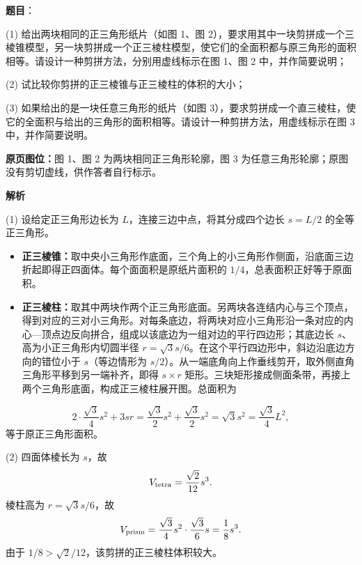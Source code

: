 \begin{answer}

\textbf{题目}：

(1) 给出两块相同的正三角形纸片（如图 1、图 2），要求用其中一块剪拼成一个三棱锥模型，另一块剪拼成一个正三棱柱模型，使它们的全面积都与原三角形的面积相等。请设计一种剪拼方法，分别用虚线标示在图 1、图 2 中，并作简要说明；

(2) 试比较你剪拼的正三棱锥与正三棱柱的体积的大小；

(3) 如果给出的是一块任意三角形的纸片（如图 3），要求剪拼成一个直三棱柱，使它的全面积与给出的三角形的面积相等。请设计一种剪拼方法，用虚线标示在图 3 中，并作简要说明。

\textbf{原页图位：}图 1、图 2 为两块相同正三角形轮廓，图 3 为任意三角形轮廓；原图没有剪切虚线，供作答者自行标示。
\nopagebreak[4]
\begin{center}\end{center}
\nopagebreak[4]
\textbf{解析}
\nopagebreak[4]
\begin{center}\end{center}
\nopagebreak[4]

(1) 设给定正三角形边长为 $L$，连接三边中点，将其分成四个边长 $s=L/2$ 的全等正三角形。

\begin{itemize}
\item \textbf{正三棱锥：}取中央小三角形作底面，三个角上的小三角形作侧面，沿底面三边折起即得正四面体。每个面面积是原纸片面积的 $1/4$，总表面积正好等于原面积。
\item \textbf{正三棱柱：}取其中两块作两个正三角形底面。另两块各连结内心与三个顶点，得到对应的三对小三角形。对每条底边，将两块对应小三角形沿一条对应的内心—顶点边反向拼合，组成以该底边为一组对边的平行四边形；其底边长 $s$、高为小正三角形内切圆半径 $r=\sqrt3s/6$。在这个平行四边形中，斜边沿底边方向的错位小于 $s$（等边情形为 $s/2$）。从一端底角向上作垂线剪开，取外侧直角三角形平移到另一端补齐，即得 $s\times r$ 矩形。三块矩形接成侧面条带，再接上两个三角形底面，构成正三棱柱展开图。总面积为
\end{itemize}
\nopagebreak[4]
\[
  2\cdot\frac{\sqrt3}{4}s^2+3sr
  =\frac{\sqrt3}{2}s^2+\frac{\sqrt3}{2}s^2
  =\sqrt3s^2=\frac{\sqrt3}{4}L^2,
\]
  等于原正三角形面积。


(2) 四面体棱长为 $s$，故
\nopagebreak[4]
\[
V_{\rm tetra}=\frac{\sqrt2}{12}s^3.
\]
棱柱高为 $r=\sqrt3s/6$，故
\nopagebreak[4]
\[
V_{\rm prism}=\frac{\sqrt3}{4}s^2\cdot\frac{\sqrt3}{6}s=\frac18s^3.
\]
由于 $1/8>\sqrt2/12$，该剪拼的正三棱柱体积较大。


\end{answer}

